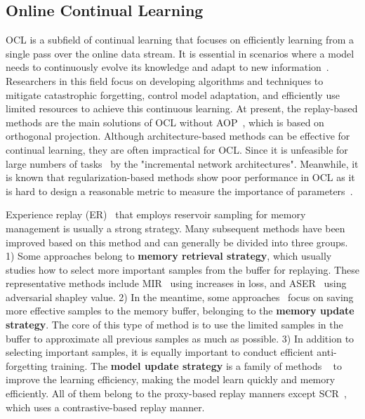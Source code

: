 \subsection{Online Continual Learning}
OCL is a subfield of continual learning that focuses on efficiently learning from a single pass over the online data stream. It is essential in scenarios where a model needs to continuously evolve its knowledge and adapt to new information~\cite{mai2022online}. Researchers in this field focus on developing algorithms and techniques to mitigate catastrophic forgetting, control model adaptation, and efficiently use limited resources to achieve this continuous learning. At present, the replay-based methods are the main solutions of OCL without AOP~\cite{guo2022adaptive}, which is based on orthogonal projection. Although architecture-based methods can be effective for continual learning, they are often impractical for OCL. Since it is unfeasible for large numbers of tasks~\cite{zhu2021class} by the "incremental network architectures". Meanwhile, it is known that regularization-based methods show poor performance in OCL as it is hard to design a reasonable metric to measure the importance of parameters~\cite{zhu2021class}. 

Experience replay (ER)~\cite{rolnick2019experience} that employs reservoir sampling for memory management is usually a strong strategy. Many subsequent methods have been improved based on this method and can generally be divided into three groups. 1) Some approaches belong to \textbf{memory retrieval strategy}, which usually studies how to select more important samples from the buffer for replaying. These representative methods include MIR~\cite{aljundi2019online} using increases in loss, and ASER~\cite{shim2021online} using adversarial shapley value. 2) In the meantime, some approaches~\cite{aljundi2019gradient,jin2021gradient} focus on saving more effective samples to the memory buffer, belonging to the \textbf{memory update strategy}. The core of this type of method is to use the limited samples in the buffer to approximate all previous samples as much as possible. 3) In addition to selecting important samples, it is equally important to conduct efficient anti-forgetting training. The \textbf{model update strategy} is a family of methods ~\cite{mai2021supervised,yin2021mitigating,caccia2021new,guo2022online,gu2022not,chrysakisonline,zhang2022simple,lin2023uer,wei2023online,michel2024learning,kim2024online} to improve the learning efficiency, making the model learn quickly and memory efficiently. All of them belong to the proxy-based replay manners except SCR~\cite{mai2021supervised}, which uses a contrastive-based replay manner. 

